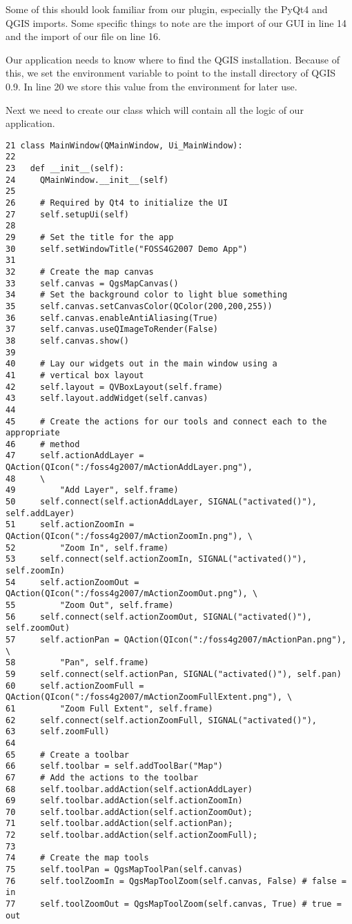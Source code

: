 Some of this should look familiar from our plugin, especially the PyQt4 and
QGIS imports. Some specific things to note are the import of our GUI in line
14 and the import of our  file on line 16.

Our application needs to know where to find the QGIS installation. Because
of this, we set the  environment variable to point to the 
install directory of QGIS 0.9. In line 20 we store this value from
the environment for later use.

Next we need to create our  class which will contain
all the logic of our application.
\begin{verbatim}
21 class MainWindow(QMainWindow, Ui_MainWindow):
22 
23   def __init__(self):
24     QMainWindow.__init__(self)
25 
26     # Required by Qt4 to initialize the UI
27     self.setupUi(self)
28 
29     # Set the title for the app
30     self.setWindowTitle("FOSS4G2007 Demo App")
31 
32     # Create the map canvas
33     self.canvas = QgsMapCanvas()
34     # Set the background color to light blue something
35     self.canvas.setCanvasColor(QColor(200,200,255))
36     self.canvas.enableAntiAliasing(True)
37     self.canvas.useQImageToRender(False)
38     self.canvas.show()
39 
40     # Lay our widgets out in the main window using a 
41     # vertical box layout
42     self.layout = QVBoxLayout(self.frame)
43     self.layout.addWidget(self.canvas)
44 
45     # Create the actions for our tools and connect each to the appropriate
46     # method
47     self.actionAddLayer = QAction(QIcon(":/foss4g2007/mActionAddLayer.png"),
48     \
49         "Add Layer", self.frame)
50     self.connect(self.actionAddLayer, SIGNAL("activated()"), self.addLayer)
51     self.actionZoomIn = QAction(QIcon(":/foss4g2007/mActionZoomIn.png"), \
52         "Zoom In", self.frame)
53     self.connect(self.actionZoomIn, SIGNAL("activated()"), self.zoomIn)
54     self.actionZoomOut = QAction(QIcon(":/foss4g2007/mActionZoomOut.png"), \
55         "Zoom Out", self.frame)
56     self.connect(self.actionZoomOut, SIGNAL("activated()"), self.zoomOut)
57     self.actionPan = QAction(QIcon(":/foss4g2007/mActionPan.png"), \
58         "Pan", self.frame)
59     self.connect(self.actionPan, SIGNAL("activated()"), self.pan)
60     self.actionZoomFull = QAction(QIcon(":/foss4g2007/mActionZoomFullExtent.png"), \
61         "Zoom Full Extent", self.frame)
62     self.connect(self.actionZoomFull, SIGNAL("activated()"),
63     self.zoomFull)
64 
65     # Create a toolbar
66     self.toolbar = self.addToolBar("Map")
67     # Add the actions to the toolbar
68     self.toolbar.addAction(self.actionAddLayer)
69     self.toolbar.addAction(self.actionZoomIn)
70     self.toolbar.addAction(self.actionZoomOut);
71     self.toolbar.addAction(self.actionPan);
72     self.toolbar.addAction(self.actionZoomFull);
73 
74     # Create the map tools
75     self.toolPan = QgsMapToolPan(self.canvas)
76     self.toolZoomIn = QgsMapToolZoom(self.canvas, False) # false = in
77     self.toolZoomOut = QgsMapToolZoom(self.canvas, True) # true = out
\end{verbatim}

